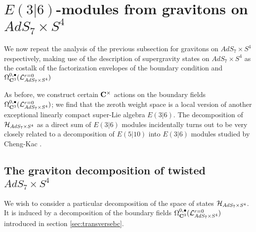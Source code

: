\documentclass[../main.tex]{subfiles}
\begin{document}
 

\section{$E(3|6)$-modules from gravitons on $AdS_7\times S^4$}\label{sec:e36}

We now repeat the analysis of the previous subsection for gravitons on $AdS_7\times S^4$ respectively, making use of the description of supergravity states on $AdS_7\times S^4$ as the costalk of the factorization envelopes of the boundary condition and $\Omega^{0,\bullet}_{\mathbf{C}^3} (\mathcal{L}^{{r=0}}_{AdS_7\times S^4})$

As before, we construct certain $\mathbf{C}^\times$ actions on the boundary fields $\Omega^{0,\bullet}_{\mathbf{C}^3} (\mathcal{L}^{{r=0}}_{AdS_7\times S^4})$; we find that the zeroth weight space is a local version of another exceptional linearly compact super-Lie algebra $E(3|6)$. The decomposition of $\mathcal{H}_{AdS_7\times S^4}$ as a direct sum of $E(3|6)$ modules incidentally turns out to be very closely related to a decomposition of $E(5|10)$ into $E(3|6)$ modules studied by Cheng-Kac \cite{}.

\subsection{The graviton decomposition of twisted $AdS_7\times S^4$}
We wish to consider a particular decomposition of the space of states $\mathcal{H}_{AdS_7\times S^4}$. It is induced by a decomposition of the boundary fields $\Omega^{0,\bullet}_{\mathbf{C}^3} (\mathcal{L}^{{r=0}}_{AdS_7\times S^4} )$ introduced in section \ref{sec:transversebc}. 
\end{document}
